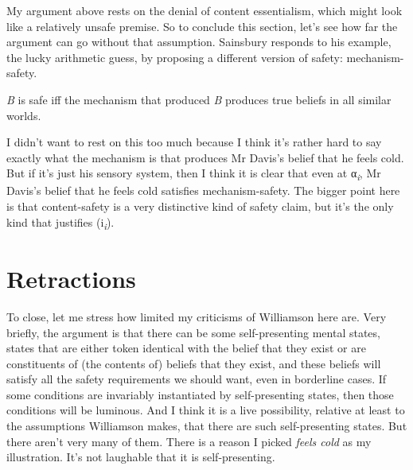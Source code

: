 \documentclass[
  11pt,
  letterpaper,
  DIV=11,
  numbers=noendperiod,
  twoside]{scrartcl}
\providecommand{\tightlist}{%
  \setlength{\itemsep}{0pt}\setlength{\parskip}{0pt}}
\renewcommand{\textsc}[1]{{\scfont #1}}
\begin{document}
My argument above rests on the denial of content essentialism, which
might look like a relatively unsafe premise. So to conclude this
section, let's see how far the argument can go without that assumption.
Sainsbury responds to his example, the lucky arithmetic guess, by
proposing a different version of safety: mechanism-safety.

\begin{description}
\tightlist
\item[Mechanism-safety]
\emph{B} is safe iff the mechanism that produced \emph{B} produces true
beliefs in all similar worlds.
\end{description}

I didn't want to rest on this too much because I think it's rather hard
to say exactly what the mechanism is that produces Mr Davis's belief
that he feels cold. But if it's just his sensory system, then I think it
is clear that even at α\textsubscript{\emph{i}}, Mr Davis's belief that
he feels cold satisfies mechanism-safety. The bigger point here is that
content-safety is a very distinctive kind of safety claim, but it's the
only kind that justifies (\textsc{i}\textsubscript{\emph{i}}).

\section{Retractions}\label{retractions}

To close, let me stress how limited my criticisms of Williamson here
are. Very briefly, the argument is that there can be some
self-presenting mental states, states that are either token identical
with the belief that they exist or are constituents of (the contents of)
beliefs that they exist, and these beliefs will satisfy all the safety
requirements we should want, even in borderline cases. If some
conditions are invariably instantiated by self-presenting states, then
those conditions will be luminous. And I think it is a live possibility,
relative at least to the assumptions Williamson makes, that there are
such self-presenting states. But there aren't very many of them. There
is a reason I picked \emph{feels cold} as my illustration. It's not
laughable that it is self-presenting.
\end{document}

